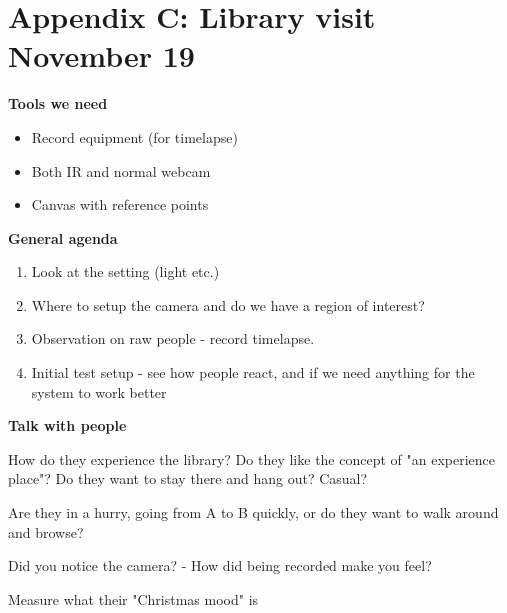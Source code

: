 \section{Appendix C: Library visit November 19}\label{targetgroup_visit}
\textbf{Tools we need}
\begin{itemize}
\item Record equipment (for timelapse)
\item Both IR and normal webcam
\item Canvas with reference points
\end{itemize}

\textbf{General agenda}
\begin{enumerate}
\item Look at the setting (light etc.)
\item Where to setup the camera and do we have a region of interest?
\item Observation on raw people - record timelapse.
\item Initial test setup - see how people react, and if we need anything for the system to work better
\end{enumerate}

\textbf{Talk with people}

How do they experience the library? Do they like the concept of "an experience place"? Do they want to stay there and hang out? Casual?

Are they in a hurry, going from A to B quickly, or do they want to walk around and browse?

Did you notice the camera?
- How did being recorded make you feel?

Measure what their "Christmas mood" is